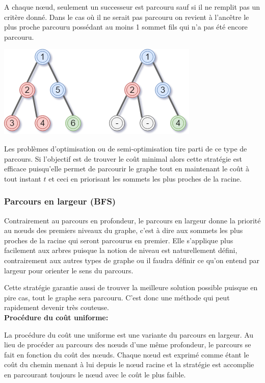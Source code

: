 A chaque nœud, seulement un successeur est parcouru sauf si il ne remplit pas un critère donné. Dans le cas où il ne serait pas parcouru on revient à l'ancêtre le plus proche parcouru possédant au moins 1 sommet fils qui n'a pas été encore parcouru.

\begin{center}
    \includegraphics[scale=0.6]{../ressources/images/depth_first_search.png}
\end{center}

Les problèmes d'optimisation ou de semi-optimisation tire parti de ce type de parcours. Si l'objectif est de trouver le coût minimal alors cette stratégie est efficace puisqu'elle permet de parcourir le graphe tout en maintenant le coût à tout instant $t$ et ceci en priorisant les sommets les plus proches de la racine.

\subsubsection{Parcours en largeur (BFS)}
Contrairement au parcours en profondeur, le parcours en largeur donne la priorité au nœuds des premiers niveaux du graphe, c'est à dire aux sommets les plus proches de la racine qui seront parcourus en premier. Elle s'applique plus facilement aux arbres puisque la notion de niveau est naturellement défini, contrairement aux autres types de graphe ou il faudra définir ce qu'on entend par largeur pour orienter le sens du parcours.

Cette stratégie garantie aussi de trouver la meilleure solution possible puisque en pire cas, tout le graphe sera parcouru. C'est donc une méthode qui peut rapidement devenir très couteuse.\\

{\setlength{\parindent}{0cm}\textbf{Procédure du coût uniforme:}}

La procédure du coût une uniforme est une variante du parcours en largeur. Au lieu de procéder au parcours des nœuds d'une même profondeur, le parcours se fait en fonction du coût des nœuds. Chaque nœud est exprimé comme étant le coût du chemin menant à lui depuis le nœud racine et la stratégie est accomplie en parcourant toujours le nœud avec le coût le plus faible.

